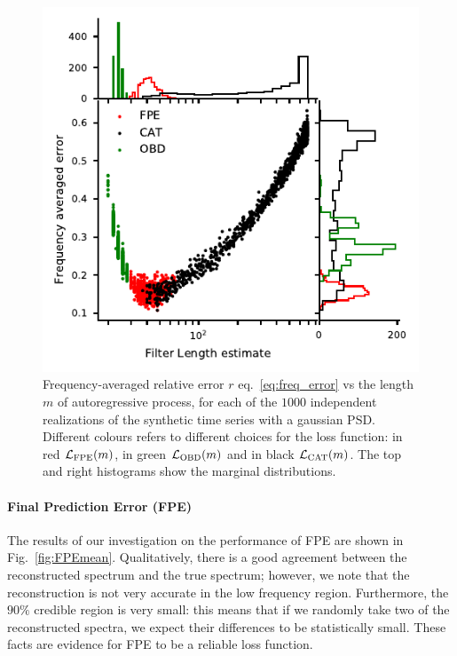 \documentclass[twocolumn,showpacs,preprintnumbers,nofootinbib,prd,
superscriptaddress,10pt]{revtex4-1}
\begin{document}
\begin{figure}
	\centering
	\includegraphics[width = \linewidth]{Images/optimisers_comparison/normal/error_length_contour.pdf}
	\caption{Frequency-averaged relative error $r$ eq.~\eqref{eq:freq_error} vs the length $m$ of autoregressive process, for each of the $1000$ independent realizations of the synthetic time series with a gaussian PSD. Different colours refers to different choices for the loss function: in red $\mathcal{L}_{\rm FPE}(m)$, in green $\mathcal{L}_{\rm OBD}(m)$ and in black $\mathcal{L}_{\rm CAT}(m)$. The top and right histograms show the marginal distributions.}
	\label{fig:optcomparison}
\end{figure}

\paragraph{Final Prediction Error (FPE)}
The results of our investigation on the performance of FPE are shown in Fig.~\ref{fig:FPEmean}.
Qualitatively, there is a good agreement between the reconstructed spectrum and the true spectrum; 
however, we note that the reconstruction is not very accurate in the low frequency region. 
Furthermore, the $90\%$ credible region is very small: this means that if we randomly take two of the reconstructed spectra, we expect their differences to be statistically small. These facts are evidence for FPE to be a reliable loss function.
\end{document}
